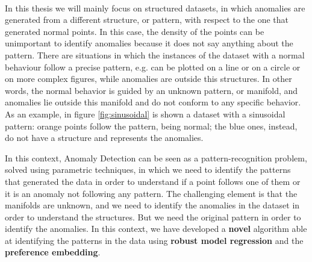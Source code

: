 \paragraph{}
In this thesis we will mainly focus on structured datasets, in which anomalies are generated from a different structure, or pattern, with respect to the one that generated normal points. In this case, the density of the points can be unimportant to identify anomalies because it does not say anything about the pattern. There are situations in which the instances of the dataset with a normal behaviour follow a precise pattern, e.g. can be plotted on a line or on a circle or on more complex figures, while anomalies are outside this structures. In other words, the normal behavior is guided by an unknown pattern, or manifold, and anomalies lie outside this manifold and do not conform to any specific behavior. As an example, in figure \ref{fig:sinusoidal} is shown a dataset with a sinusoidal pattern: orange points follow the pattern, being normal; the blue ones, instead, do not have a structure and represents the anomalies.


In this context, Anomaly Detection can be seen as a pattern-recognition problem, solved using parametric techniques, in which we need to identify the patterns that generated the data in order to understand if a point follows one of them or it is an anomaly not following any pattern. \newline
The challenging element is that the manifolds are unknown, and we need to identify the anomalies in the dataset in order to understand the structures. But we need the original pattern in order to identify the anomalies.
In this context, we have developed a \textbf{novel} algorithm able at identifying the patterns in the data using \textbf{robust model regression} and the \textbf{preference embedding}. 


